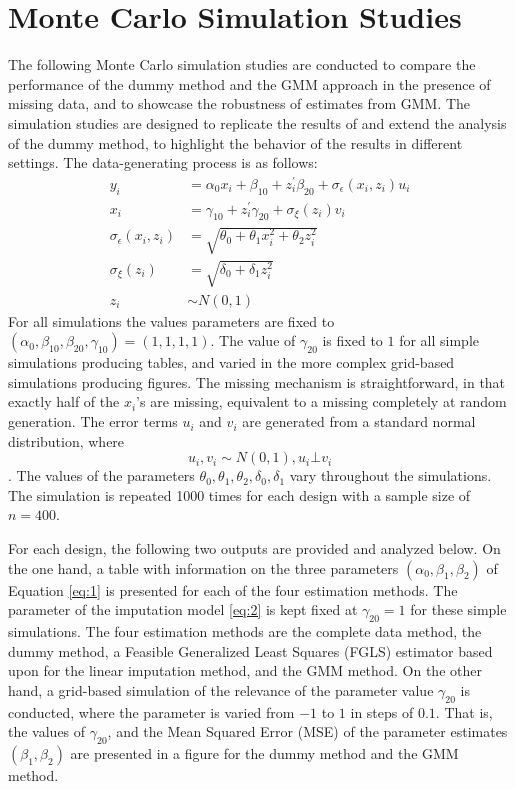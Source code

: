 \section{Monte Carlo Simulation Studies}
The following Monte Carlo simulation studies are conducted to compare the performance of the dummy method and the GMM approach in the presence of missing data, and to showcase the robustness of estimates from GMM.
The simulation studies are designed to replicate the results of \cite{abrevaya2017} and extend the analysis of the dummy method, to highlight the behavior of the results in different settings.
The data-generating process is as follows:
\begin{align*}
    y_i & = \alpha_0 x_i + \beta_{10} + z_i^{\prime} \beta_{20} + \sigma_{\epsilon}(x_i, z_i) u_i \\
    x_i & = \gamma_{10} + z_i^{\prime} \gamma_{20} + \sigma_{\xi}(z_i) v_i \\
    \sigma_{\epsilon}(x_i, z_i) & = \sqrt{\theta_0 + \theta_1 x_i^2 + \theta_2 z_i^2} \\
    \sigma_{\xi}(z_i) & = \sqrt{\delta_0 + \delta_1 z_i^2} \\
    z_i & \sim N(0, 1)
\end{align*}
For all simulations the values parameters are fixed to $(\alpha_0, \beta_{10}, \beta_{20}, \gamma_{10}) = (1,1,1,1)$.
The value of $\gamma_{20}$ is fixed to $1$ for all simple simulations producing tables, and varied in the more complex grid-based simulations producing figures.
The missing mechanism is straightforward, in that exactly half of the $x_i$'s are missing, equivalent to a missing completely at random generation.
The error terms $u_i$ and $v_i$ are generated from a standard normal distribution, where $$u_i, v_i \sim N(0, 1), u_i \bot v_i$$.
The values of the parameters $\theta_0, \theta_1, \theta_2, \delta_0, \delta_1$ vary throughout the simulations.
The simulation is repeated 1000 times for each design with a sample size of $n = 400$.

For each design, the following two outputs are provided and analyzed below.
On the one hand, a table with information on the three parameters $(\alpha_0, \beta_1, \beta_2)$ of Equation \eqref{eq:1} is presented for each of the four estimation methods.
The parameter of the imputation model \eqref{eq:2} is kept fixed at $\gamma_{20} = 1$ for these simple simulations.
The four estimation methods are the complete data method, the dummy method, a Feasible Generalized Least Squares (FGLS) estimator based upon \citet{dagenais1973} for the linear imputation method, and the GMM method.
On the other hand, a grid-based simulation of the relevance of the parameter value $\gamma_{20}$ is conducted, where the parameter is varied from $-1$ to $1$ in steps of $0.1$.
That is, the values of $\gamma_{20}$, and the Mean Squared Error (MSE) of the parameter estimates $(\beta_1, \beta_2)$ are presented in a figure for the dummy method and the GMM method.

